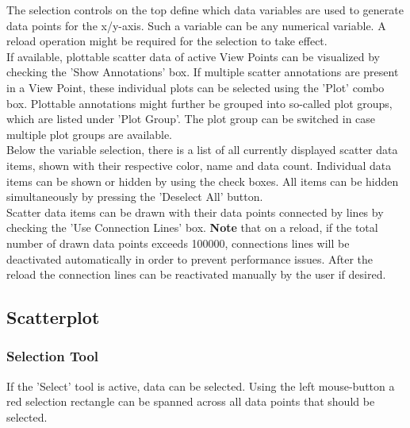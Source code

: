 The selection controls on the top define which data variables are used to generate data points for the x/y-axis. 
Such a variable can be any numerical variable. A reload operation might be required for the selection to take effect. \\

If available, plottable scatter data of active View Points can be visualized by checking the 'Show Annotations' box. 
If multiple scatter annotations are present in a View Point, these individual plots can be selected using the 'Plot' combo box.
Plottable annotations might further be grouped into so-called plot groups, which are listed under 'Plot Group'.
The plot group can be switched in case multiple plot groups are available. \\

Below the variable selection, there is a list of all currently displayed scatter data items, shown with their respective color, name and data count.
Individual data items can be shown or hidden by using the check boxes. All items can be hidden simultaneously by pressing the 'Deselect All' button. \\

Scatter data items can be drawn with their data points connected by lines by checking the 'Use Connection Lines' box.
\textbf{Note} that on a reload, if the total number of drawn data points exceeds 100000, connections lines will be deactivated automatically
in order to prevent performance issues. After the reload the connection lines can be reactivated manually by the user if desired.

\subsection{Scatterplot}

\subsubsection{Selection Tool}

If the 'Select' tool is active, data can be selected. Using the left mouse-button a red selection rectangle can be spanned across all data points that should be selected.

